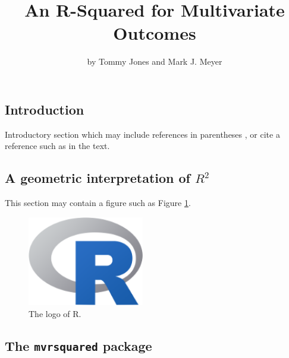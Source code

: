 \title{An R-Squared for Multivariate Outcomes}
\author{by Tommy Jones and Mark J. Meyer}

\maketitle


\hypertarget{introduction}{%
\subsection{Introduction}\label{introduction}}

Introductory section which may include references in parentheses
\citep{R}, or cite a reference such as \citet{R} in the text.

\hypertarget{a-geometric-interpretation-of-r2}{%
\subsection{\texorpdfstring{A geometric interpretation of
\(R^2\)}{A geometric interpretation of R\^{}2}}\label{a-geometric-interpretation-of-r2}}

This section may contain a figure such as Figure \ref{fig:Rlogo}.

\begin{Schunk}
\begin{figure}[htbp]

{\centering \includegraphics[width=2in]{Rlogo-5} 

}

\caption[The logo of R]{The logo of R.}\label{fig:Rlogo}
\end{figure}
\end{Schunk}

\hypertarget{the-mvrsquared-package}{%
\subsection{\texorpdfstring{The \texttt{mvrsquared}
package}{The mvrsquared package}}\label{the-mvrsquared-package}}

